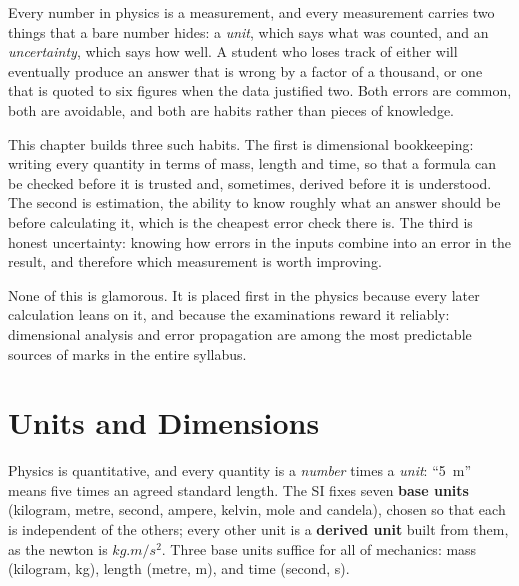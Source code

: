 

Every number in physics is a measurement, and every measurement carries two things that a bare number
hides: a \emph{unit}, which says what was counted, and an \emph{uncertainty}, which says how well. A
student who loses track of either will eventually produce an answer that is wrong by a factor of a
thousand, or one that is quoted to six figures when the data justified two. Both errors are common,
both are avoidable, and both are habits rather than pieces of knowledge.

This chapter builds three such habits. The first is dimensional bookkeeping: writing every quantity in
terms of mass, length and time, so that a formula can be checked before it is trusted and, sometimes,
derived before it is understood. The second is estimation, the ability to know roughly what an answer
should be before calculating it, which is the cheapest error check there is. The third is honest
uncertainty: knowing how errors in the inputs combine into an error in the result, and therefore which
measurement is worth improving.

None of this is glamorous. It is placed first in the physics because every
later calculation leans on it, and because the examinations reward it reliably: dimensional analysis
and error propagation are among the most predictable sources of marks in the entire syllabus.

\section{Units and Dimensions}

Physics is quantitative, and every quantity is a \emph{number} times a \emph{unit}: ``\SI{5}{m}''
means five times an agreed standard length. The SI fixes seven \textbf{base units} (kilogram, metre,
second, ampere, kelvin, mole and candela), chosen so that each is independent of the others; every
other unit is a \textbf{derived unit} built from them, as the newton is $\si{kg.m/s^2}$. Three base units
suffice for all of mechanics: mass (kilogram, kg), length (metre, m), and time (second, s).

